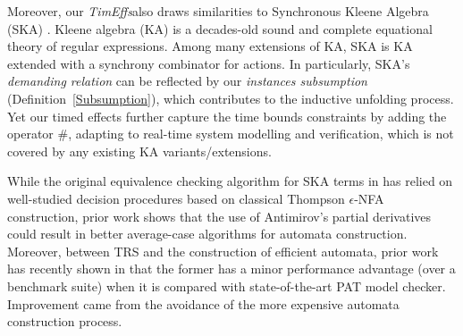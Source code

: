 \documentclass[acmsmall,10pt,review]{acmart}
\newcommand{\timedEffects}{\emph{TimEffs}}
\newcommand{\code}[1]{{\tt{\ensuremath{\m{#1}}}}}
\newcommand{\m}{\mathit}
\newcommand\defref[1]{Definition~\textcolor{blue}{\ref{#1}}}
\begin{document}
{%

Moreover, our \timedEffects also draws similarities to Synchronous Kleene Algebra (SKA) \cite{prisacariu2010synchronous}. 
Kleene algebra (KA) is a decades-old sound and complete equational theory of regular expressions. Among many extensions of KA,
  SKA is KA extended with a synchrony combinator for actions. In particularly, SKA's \emph{demanding relation} can be reflected by our \emph{instances subsumption} (\defref{Subsumption}), which contributes to the inductive unfolding process. 
Yet our timed effects further capture the time bounds constraints by adding the operator \code{\#}, adapting to real-time system modelling and verification, which is not covered by any existing KA variants/extensions. 




While the original equivalence checking algorithm for SKA terms in \cite{prisacariu2010synchronous} has
relied on well-studied decision procedures based on classical Thompson \code{\epsilon}-NFA construction, prior work \cite{broda2015deciding}  shows that the use of Antimirov's partial derivatives
could result in better average-case algorithms for automata construction. 
Moreover, between TRS and the construction of efficient automata, prior work has recently shown in \cite{song2020automated} that the former has a minor performance advantage (over a benchmark suite) when it is compared with state-of-the-art PAT \cite{sun2009pat} model checker.
Improvement came from the avoidance of the more expensive automata construction process.



}
\end{document}
